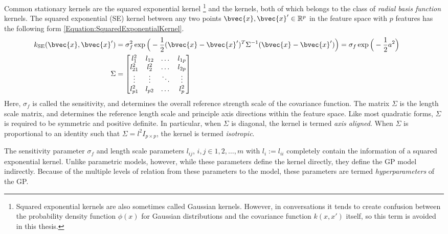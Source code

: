 			Common stationary kernels are the squared exponential kernel \footnote{Squared exponential kernels are also sometimes called Gaussian kernels. However, in conversations it tends to create confusion between the probability density function $\phi(x)$ for Gaussian distributions and the covariance function $k(x, x')$ itself, so this term is avoided in this thesis.} and the \matern kernels, both of which belongs to the class of \textit{radial basis function} kernels. The squared exponential (SE) kernel between any two points $\bvec{x}, \bvec{x}' \in \mathbb{R}^{p}$ in the feature space with $p$ features has the following form \eqref{Equation:SquaredExponentialKernel}. \begin{equation}
				\left.
					\begin{aligned}
						k_{\mathrm{SE}}(\bvec{x}, \bvec{x}') &= \sigma_{f}^{2} \exp\Big(-\frac{1}{2}(\bvec{x} - \bvec{x}')^{T} \Sigma^{-1} (\bvec{x} - \bvec{x}')\Big) = \sigma_{f} \exp\Big(-\frac{1}{2} a^{2} \Big) \\
						\Sigma &= 	\begin{bmatrix}
										l_{1}^{2} & l_{12} & \dots & l_{1p} \\
										l_{21}^{2} & l_{2}^{2} & \dots & l_{2p} \\
										\vdots & \vdots  & \ddots & \vdots \\
										l_{p1}^{2} & l_{p2} & \dots & l_{p}^{2} \\
								  	\end{bmatrix}
					\end{aligned}
				\qquad \right.
			\label{Equation:SquaredExponentialKernel}
			\end{equation} Here, $\sigma_{f}$ is called the sensitivity, and determines the overall reference strength scale of the covariance function. The matrix $\Sigma$ is the length scale matrix, and determines the reference length scale and principle axis directions within the feature space. Like most quadratic forms, $\Sigma$ is required to be symmetric and positive definite. In particular, when $\Sigma$ is diagonal, the kernel is termed \textit{axis aligned}. When $\Sigma$ is proportional to an identity such that $\Sigma = l^{2} I_{p \times p}$, the kernel is termed \textit{isotropic}.
			
			The sensitivity parameter $\sigma_{f}$ and length scale parameters $l_{ij}$, $i, j \in {1, 2, \dots, m}$ with $l_{i} := l_{ii}$ completely contain the information of a squared exponential kernel. Unlike parametric models, however, while these parameters define the kernel directly, they define the GP model indirectly. Because of the multiple levels of relation from these parameters to the model, these parameters are termed \textit{hyperparameters} of the GP.
			
